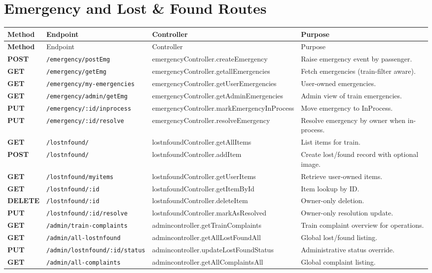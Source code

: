 \documentclass[12pt,a4paper]{report}
\begin{document}
\section{Emergency and Lost \& Found Routes}
\begin{longtable}{>{\bfseries}p{} p{} p{} p{}}
\toprule
\rowcolor{TableHeader}
\textcolor{TableHeaderText}{Method} & \textcolor{TableHeaderText}{Endpoint} & \textcolor{TableHeaderText}{Controller} & \textcolor{TableHeaderText}{Purpose} \\
\midrule
\endfirsthead
\toprule
\rowcolor{TableHeader}
\textcolor{TableHeaderText}{Method} & \textcolor{TableHeaderText}{Endpoint} & \textcolor{TableHeaderText}{Controller} & \textcolor{TableHeaderText}{Purpose} \\
\midrule
\endhead
POST & \texttt{/emergency/postEmg} & emergencyController.createEmergency & Raise emergency event by passenger. \\
GET & \texttt{/emergency/getEmg} & emergencyController.getallEmergencies & Fetch emergencies (train-filter aware). \\
GET & \texttt{/emergency/my-emergencies} & emergencyController.getUserEmergencies & User-owned emergencies. \\
GET & \texttt{/emergency/admin/getEmg} & emergencyController.getAdminEmergencies & Admin view of train emergencies. \\
PUT & \texttt{/emergency/:id/inprocess} & emergencyController.markEmergencyInProcess & Move emergency to InProcess. \\
PUT & \texttt{/emergency/:id/resolve} & emergencyController.resolveEmergency & Resolve emergency by owner when in-process. \\
GET & \texttt{/lostnfound/} & lostnfoundController.getAllItems & List items for train. \\
POST & \texttt{/lostnfound/} & lostnfoundController.addItem & Create lost/found record with optional image. \\
GET & \texttt{/lostnfound/myitems} & lostnfoundController.getUserItems & Retrieve user-owned items. \\
GET & \texttt{/lostnfound/:id} & lostnfoundController.getItemById & Item lookup by ID. \\
DELETE & \texttt{/lostnfound/:id} & lostnfoundController.deleteItem & Owner-only deletion. \\
PUT & \texttt{/lostnfound/:id/resolve} & lostnfoundController.markAsResolved & Owner-only resolution update. \\
GET & \texttt{/admin/train-complaints} & admincontroller.getTrainComplaints & Train complaint overview for operations. \\
GET & \texttt{/admin/all-lostnfound} & admincontroller.getAllLostFoundAll & Global lost/found listing. \\
PUT & \texttt{/admin/lostnfound/:id/status} & admincontroller.updateLostFoundStatus & Administrative status override. \\
GET & \texttt{/admin/all-complaints} & admincontroller.getAllComplaintsAll & Global complaint listing. \\
\bottomrule
\end{longtable}
\end{document}
